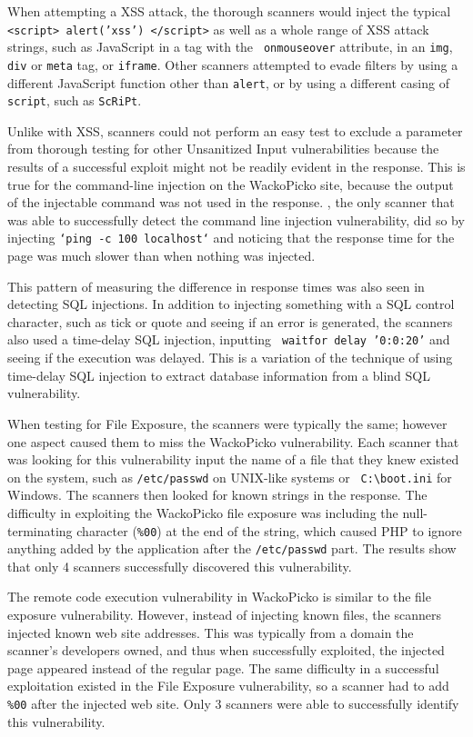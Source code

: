 When attempting a XSS attack, the thorough scanners would inject the
typical {\tt <script> alert('xss') </script>} as well as a whole range
of XSS attack strings, such as JavaScript in a tag with the {\tt
  onmouseover} attribute, in an {\tt img}, {\tt div} or {\tt meta}
tag, or {\tt iframe}. Other scanners attempted to evade
filters by using a different JavaScript function other than {\tt alert}, or by
using a different casing of {\tt script}, such as {\tt ScRiPt}.

Unlike with XSS, scanners could not perform an easy test
to exclude a parameter from thorough testing for other Unsanitized Input
vulnerabilities because the results
of a successful exploit might not be readily evident in the response. This is
true for the command-line injection on the WackoPicko
site, because the output of the injectable command was not used in the
response. 
\burp{}, the only scanner that was able to successfully detect the command line
injection vulnerability, did so by injecting {\tt `ping -c 100 localhost`} and noticing that
the response time for the page was much slower than when nothing was injected.

This pattern of measuring the difference in response times was also
seen in detecting SQL injections. In addition to injecting something with a
SQL control character, such as tick or quote and seeing if an error is
generated, the scanners also used a time-delay SQL injection,
inputting {\tt
  waitfor delay '0:0:20'} and seeing if the execution was
delayed. This is a variation of the technique of using time-delay SQL
injection to extract database information from a blind SQL vulnerability.

When testing for File Exposure, the scanners were typically the same; however
one aspect caused them to miss the WackoPicko vulnerability. Each scanner that
was looking for this vulnerability input the name of a file that they knew
existed on the system, such as {\tt /etc/passwd} on UNIX-like systems or {\tt
  \verb|C:\boot.ini|} for Windows. The scanners then looked for known strings
in the response. The difficulty in exploiting the WackoPicko file exposure was
including the null-terminating character ({\tt \%00}) at the end of
the string, which caused PHP to ignore 
anything added by the application after the {\tt /etc/passwd} part. The results show that only 4
scanners successfully discovered this vulnerability.

The remote code execution vulnerability in WackoPicko is similar to the file exposure
vulnerability. However, instead of injecting known files, the scanners injected
known web site addresses. This was typically from a domain the scanner's developers
owned, and thus when successfully exploited, the injected page appeared
instead of the regular page. The same difficulty in a successful exploitation
existed in the File Exposure vulnerability, so a scanner had to add {\tt \%00}
after the injected web site. Only 3 scanners were able to successfully
identify this vulnerability.

